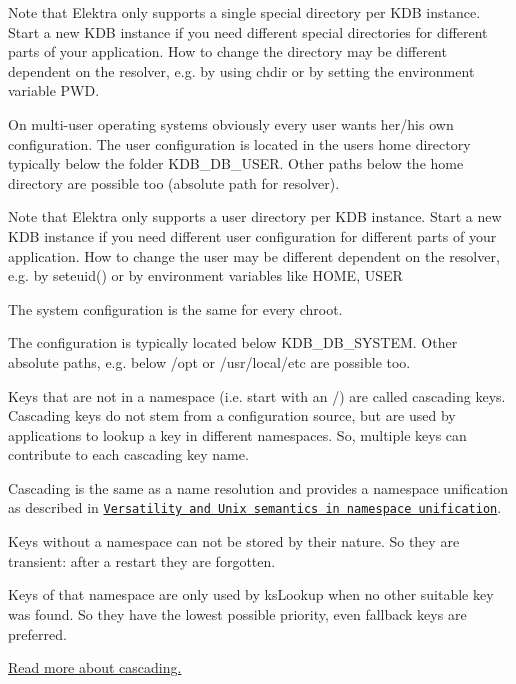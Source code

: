 Note that Elektra only supports a single special directory per K\+DB instance. Start a new K\+DB instance if you need different special directories for different parts of your application. How to change the directory may be different dependent on the resolver, e.\+g. by using chdir or by setting the environment variable {\ttfamily P\+WD}.

On multi-\/user operating systems obviously every user wants her/his own configuration. The user configuration is located in the users home directory typically below the folder {\ttfamily K\+D\+B\+\_\+\+D\+B\+\_\+\+U\+S\+ER.} Other paths below the home directory are possible too (absolute path for resolver).

Note that Elektra only supports a user directory per K\+DB instance. Start a new K\+DB instance if you need different user configuration for different parts of your application. How to change the user may be different dependent on the resolver, e.\+g. by {\ttfamily seteuid()} or by environment variables like {\ttfamily H\+O\+ME}, {\ttfamily U\+S\+ER}

The system configuration is the same for every chroot.

The configuration is typically located below {\ttfamily K\+D\+B\+\_\+\+D\+B\+\_\+\+S\+Y\+S\+T\+EM}. Other absolute paths, e.\+g. below {\ttfamily /opt} or {\ttfamily /usr/local/etc} are possible too.

Keys that are not in a namespace (i.\+e. start with an {\ttfamily /}) are called cascading keys. Cascading keys do not stem from a configuration source, but are used by applications to lookup a key in different namespaces. So, multiple keys can contribute to each cascading key name.

Cascading is the same as a name resolution and provides a namespace unification as described in \href{https://dl.acm.org/doi/10.1145/1138041.1138045}{\tt Versatility and Unix semantics in namespace unification}.

Keys without a namespace can not be stored by their nature. So they are transient\+: after a restart they are forgotten.

Keys of that namespace are only used by ks\+Lookup when no other suitable key was found. So they have the lowest possible priority, even fallback keys are preferred.

\hyperlink{doc_help_elektra-cascading_md}{Read more about cascading.} 